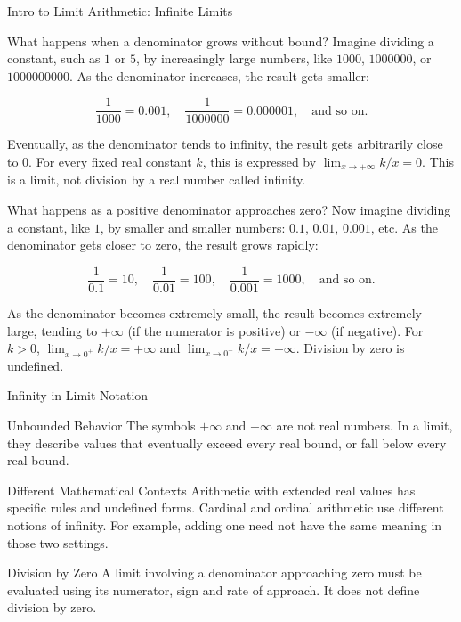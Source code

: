 \documentclass[10pt]{beamer}
\begin{document}
\begin{frame}{Intro to Limit Arithmetic: Infinite Limits}
	
	\fontsize{8.5}{11}
	
	\begin{block}{What happens when a denominator grows without bound?}
		Imagine dividing a constant, such as \( 1 \) or \( 5 \), by increasingly large numbers, like \( 1000 \), \( 1000000 \), or \( 1000000000 \). As the denominator increases, the result gets smaller:
		
		\[
		\frac{1}{1000} = 0.001, \quad \frac{1}{1000000} = 0.000001, \quad \text{and so on.}
		\]
		
		Eventually, as the denominator tends to infinity, the result gets arbitrarily close to \( 0 \). For every fixed real constant \(k\), this is expressed by \(\lim_{x\to+\infty}k/x=0\). This is a limit, not division by a real number called infinity.
	\end{block}
	
	
	\begin{block}{What happens as a positive denominator approaches zero?}
		Now imagine dividing a constant, like \( 1 \), by smaller and smaller numbers: \( 0.1 \), \( 0.01 \), \( 0.001 \), etc. As the denominator gets closer to zero, the result grows rapidly:
		
		\[
		\frac{1}{0.1} = 10, \quad \frac{1}{0.01} = 100, \quad \frac{1}{0.001} = 1000, \quad \text{and so on.}
		\]
		
		As the denominator becomes extremely small, the result becomes extremely large, tending to \( +\infty \) (if the numerator is positive) or \( -\infty \) (if negative). For \(k>0\), \(\lim_{x\to0^+}k/x=+\infty\) and \(\lim_{x\to0^-}k/x=-\infty\). Division by zero is undefined.
	\end{block}
	
\end{frame}
\begin{frame}{Infinity in Limit Notation}
\begin{block}{Unbounded Behavior}
The symbols \(+\infty\) and \(-\infty\) are not real numbers. In a limit, they describe values that eventually exceed every real bound, or fall below every real bound.
\end{block}
\begin{block}{Different Mathematical Contexts}
Arithmetic with extended real values has specific rules and undefined forms. Cardinal and ordinal arithmetic use different notions of infinity. For example, adding one need not have the same meaning in those two settings.
\end{block}
\begin{block}{Division by Zero}
A limit involving a denominator approaching zero must be evaluated using its numerator, sign and rate of approach. It does not define division by zero.
\end{block}
\end{frame}
\end{document}
